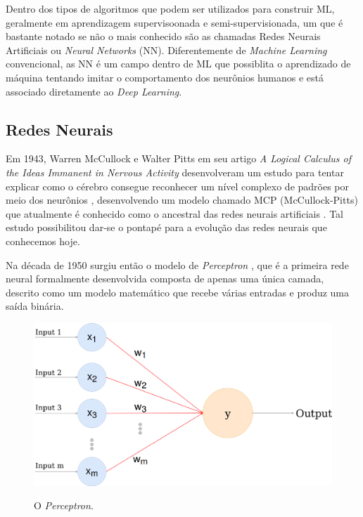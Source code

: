 Dentro dos tipos de algoritmos que podem ser utilizados para construir ML, geralmente em aprendizagem supervisoonada e semi-supervisionada, um que é bastante notado se não o mais conhecido são as chamadas Redes Neurais Artificiais ou \textit{Neural Networks} (NN). Diferentemente de \textit{Machine Learning} convencional, as NN é um campo dentro de ML que possiblita o aprendizado de máquina tentando imitar o comportamento dos neurônios humanos \cite{neural-net-history} e está associado diretamente ao \textit{Deep Learning}.

\subsection{Redes Neurais}

Em 1943, Warren McCullock e Walter Pitts em seu artigo \textit{A Logical Calculus of the Ideas Immanent in Nervous Activity} desenvolveram um estudo para tentar explicar como o cérebro consegue reconhecer um nível complexo de padrões por meio dos neurônios \cite{first-neuron-study}, desenvolvendo um modelo chamado MCP (McCullock-Pitts) que atualmente é conhecido como o ancestral das redes neurais artificiais \cite{dl-brief-review}. Tal estudo possibilitou dar-se o pontapé para a evolução das redes neurais que conhecemos hoje.

Na década de 1950 surgiu então o modelo de \textit{Perceptron} \cite{perceptron}, que é a primeira rede neural formalmente desenvolvida composta de apenas uma única camada, descrito como um modelo matemático que recebe várias entradas e produz uma saída binária.


\begin{figure}[h]
  \centering
  \caption{O \textit{Perceptron}.}
  \includegraphics[scale=0.2]{figuras/perceptron}
  \label{fig:perceptron}
\end{figure}

